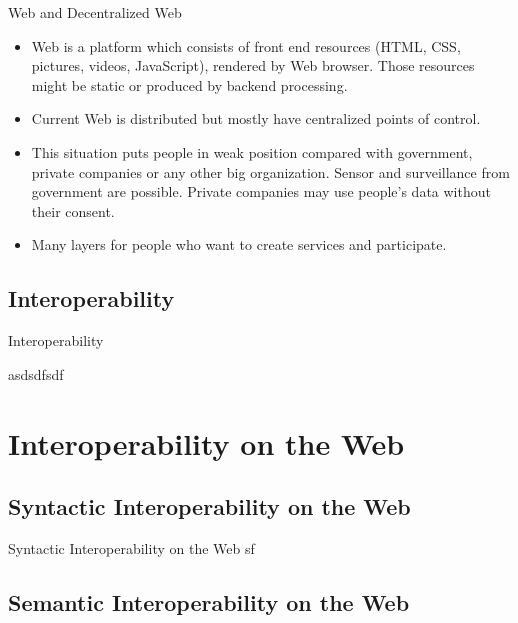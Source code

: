 \documentclass[10pt]{beamer}
\begin{document}
    \begin{frame}[allowframebreaks]{Web and Decentralized Web}

      \begin{itemize}
        \item Web is a platform which consists of front end resources (HTML, CSS, pictures, videos, JavaScript), rendered by Web browser. Those resources might be static or produced by backend processing. 
        \item Current Web is distributed but mostly have centralized points of control.
        \item This situation puts people in weak position compared with government, private companies or any other big organization. Sensor and surveillance from government are possible. Private companies may use people's data without their consent.
        \item Many layers for people who want to create services and participate.
      \end{itemize}


    \end{frame}

  \subsection{Interoperability}

    \begin{frame}[fragile]{Interoperability}

      asdsdfsdf

    \end{frame}

\section{Interoperability on the Web}

  \subsection{Syntactic Interoperability on the Web}

    \begin{frame}[fragile]{Syntactic Interoperability on the Web}
      sf
    \end{frame}

  \subsection{Semantic Interoperability on the Web}
\end{document}
